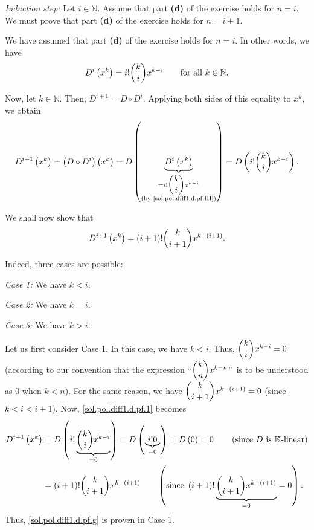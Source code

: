\documentclass[paper=a4, fontsize=12pt]{scrartcl}%
\theoremstyle{plainsl}
\theoremstyle{definition}
\theoremstyle{remark}
\begin{document}
\textit{Induction step:} Let $i\in\mathbb{N}$. Assume that part \textbf{(d)}
of the exercise holds for $n=i$. We must prove that part \textbf{(d)} of the
exercise holds for $n=i+1$.

We have assumed that part \textbf{(d)} of the exercise holds for $n=i$. In
other words, we have%
\begin{equation}
D^{i}\left(  x^{k}\right)  =i!\dbinom{k}{i}x^{k-i}\qquad\text{for all }%
k\in\mathbb{N}. \label{sol.pol.diff1.d.pf.IH}%
\end{equation}


Now, let $k\in\mathbb{N}$. Then, $D^{i+1}=D\circ D^{i}$. Applying both sides
of this equality to $x^{k}$, we obtain%
\begin{equation}
D^{i+1}\left(  x^{k}\right)  =\left(  D\circ D^{i}\right)  \left(
x^{k}\right)  =D\left(  \underbrace{D^{i}\left(  x^{k}\right)  }%
_{\substack{=i!\dbinom{k}{i}x^{k-i}\\\text{(by \eqref{sol.pol.diff1.d.pf.IH})}%
}}\right)  =D\left(  i!\dbinom{k}{i}x^{k-i}\right)  .
\label{sol.pol.diff1.d.pf.1}%
\end{equation}


We shall now show that
\begin{equation}
D^{i+1}\left(  x^{k}\right)  =\left(  i+1\right)  !\dbinom{k}{i+1}x^{k-\left(
i+1\right)  }. \label{sol.pol.diff1.d.pf.g}%
\end{equation}


Indeed, three cases are possible:

\textit{Case 1:} We have $k<i$.

\textit{Case 2:} We have $k=i$.

\textit{Case 3:} We have $k>i$.

Let us first consider Case 1. In this case, we have $k<i$. Thus, $\dbinom
{k}{i}x^{k-i}=0$ (according to our convention that the expression
\textquotedblleft$\dbinom{k}{n}x^{k-n}$\textquotedblright\ is to be understood
as $0$ when $k<n$). For the same reason, we have $\dbinom{k}{i+1}x^{k-\left(
i+1\right)  }=0$ (since $k<i<i+1$). Now, \eqref{sol.pol.diff1.d.pf.1} becomes%
\begin{align*}
D^{i+1}\left(  x^{k}\right)   &  =D\left(  i!\underbrace{\dbinom{k}{i}x^{k-i}%
}_{=0}\right)  =D\left(  \underbrace{i!0}_{=0}\right)  =D\left(  0\right)
=0\qquad\left(  \text{since }D\text{ is }\mathbb{K}\text{-linear}\right) \\
&  =\left(  i+1\right)  !\dbinom{k}{i+1}x^{k-\left(  i+1\right)  }%
\qquad\left(  \text{since }\left(  i+1\right)  !\underbrace{\dbinom{k}%
{i+1}x^{k-\left(  i+1\right)  }}_{=0}=0\right)  .
\end{align*}
Thus, \eqref{sol.pol.diff1.d.pf.g} is proven in Case 1.
\end{document}

